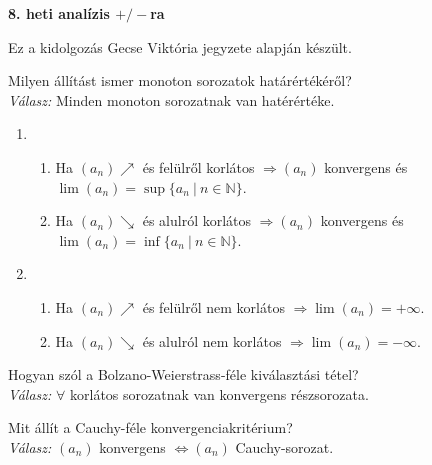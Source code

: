 \documentclass[a4paper,12pt]{article}
\begin{document}
	\def\Z{\mathbb{Z}}
	\def\Q{\mathbb{Q}}
	\def\R{\mathbb{R}}
    \def\Ra{\overline{\mathbb{R}}~~}
	\def\C{\mathbb{C}}
	\def\N{\mathbb{N}}
	\def\a{\textbf{Állítás: }}
	\def\t{\textbf{Tétel: }}
	\def\k{\textbf{Következmény: }}
	\def\d{\textbf{Definíció: }}
	\def\m{\emph{Megjegyzés: }}
	\def\p{\textsl{Példa: }}
	\def\b{\emph{Bizonyítás: }}

	\begin{center}
		\textbf{8. heti analízis $+/-$ra}
		
		Ez a kidolgozás Gecse Viktória jegyzete alapján készült.
	\end{center}
	
	\begin{compactenum}
		
    \item\noindent Milyen állítást ismer monoton sorozatok határértékéről?\\
     \emph{Válasz: } Minden monoton sorozatnak van hatérértéke.
     
    \begin{enumerate}
      \item\begin{enumerate}
          \item Ha $(a_n) \nearrow$ és felülről korlátos $\Rightarrow (a_n)$ konvergens és\\ $\lim(a_n)=\sup\{a_n~|~n \in \N \}$.
          \item Ha $(a_n) \searrow$ és alulról korlátos $\Rightarrow (a_n)$ konvergens és\\ $\lim(a_n)=\inf\{a_n~|~n \in \N \}$.
      \end{enumerate}
      \item  \begin{enumerate}
      	\item Ha $(a_n) \nearrow$ és felülről nem korlátos $\Rightarrow  \lim(a_n)=+\infty$.
      	\item Ha $(a_n) \searrow$ és alulról nem korlátos $\Rightarrow \lim(a_n)=-\infty$.
      \end{enumerate}
    \end{enumerate}
    
    \bigskip
    \item\noindent Hogyan szól a Bolzano-Weierstrass-féle kiválasztási tétel?\\
    \emph{Válasz: } $\forall$ korlátos sorozatnak van konvergens részsorozata.
    
    \bigskip
    \item\noindent Mit állít a Cauchy-féle konvergenciakritérium?\\
	 \emph{Válasz:} $(a_n)$ konvergens $\Leftrightarrow (a_n)$ Cauchy-sorozat. 
    

\end{compactenum}
\end{document}
